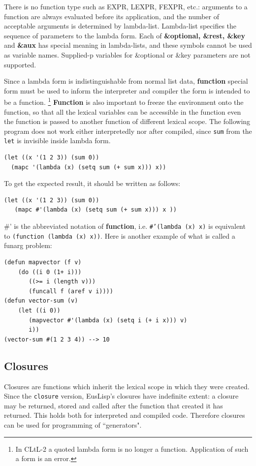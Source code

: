 There is no function type such as EXPR, LEXPR, FEXPR, etc.:
arguments to a function are always evaluated before its application,
and the number of acceptable arguments is determined by lambda-list.
Lambda-list specifies the sequence of parameters to the lambda form.
Each of {\bf \&optional, \&rest, \&key } and {\bf \&aux} has special
meaning in lambda-lists, and these symbols cannot be used as variable
names.
Supplied-p variables for \&optional or \&key parameters are not supported.

Since a lambda form is indistinguishable from normal list data,
{\bf function} special form must be used to inform the interpreter and
compiler the form is intended to be a function.
\footnote{In CLtL-2 a quoted lambda form is no longer a function.
Application of such a form is an error.}
{\bf Function} is also important to freeze the environment onto the function,
so that all the lexical variables can be accessible in the function
even the function is passed to another function of different lexical scope.
The following program does not work either interpretedly nor after compiled,
since {\tt sum} from the {\tt let} is invisible  inside lambda form.

\begin{verbatim}
(let ((x '(1 2 3)) (sum 0))
  (mapc '(lambda (x) (setq sum (+ sum x))) x))
\end{verbatim}

To get the expected result, it should be written as follows:
\begin{verbatim}
(let ((x '(1 2 3)) (sum 0))
   (mapc #'(lambda (x) (setq sum (+ sum x))) x ))
\end{verbatim}

\#' is the abbreviated notation of {\bf function},
i.e. {\tt \#'(lambda (x) x)} is equivalent to
{\tt (function (lambda (x) x))}.
Here is another example of what is called a funarg problem:

\begin{verbatim}
(defun mapvector (f v)
    (do ((i 0 (1+ i)))
       ((>= i (length v)))
       (funcall f (aref v i))))
(defun vector-sum (v)
    (let ((i 0))
       (mapvector #'(lambda (x) (setq i (+ i x))) v)
       i))
(vector-sum #(1 2 3 4)) --> 10 
\end{verbatim}

\subsection{Closures}

Closures are functions which inherit the lexical scope in which they were
created.  Since the {\tt closure} version, EusLisp's closures have indefinite
extent: a closure may be returned, stored and called after the function that
created it has returned.  This holds both for interpreted and compiled code.
Therefore closures can be used for programming of ``generators".

